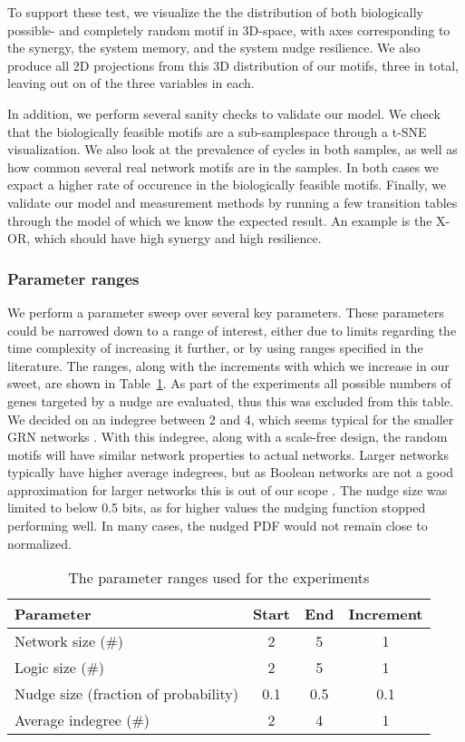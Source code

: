 \documentclass[../main.tex]{subfiles}
\begin{document}
To support these test, we visualize the the distribution of both biologically possible- and completely random motif in 3D-space, with axes corresponding to the synergy, the system memory, and the system nudge resilience.
We also produce all 2D projections from this 3D distribution of our motifs, three in total, leaving out on of the three variables in each.

In addition, we perform several sanity checks to validate our model.
We check that the biologically feasible motifs are a sub-samplespace through a t-SNE visualization.
We also look at the prevalence of cycles in both samples, as well as how common several real network motifs are in the samples.
In both cases we expact a higher rate of occurence in the biologically feasible motifs.
Finally, we validate our model and measurement methods by running a few transition tables through the model of which we know the expected result.
An example is the X-OR, which should have high synergy and high resilience.

\subsubsection{Parameter ranges}

We perform a parameter sweep over several key parameters.
These parameters could be narrowed down to a range of interest, either due to limits regarding the time complexity of increasing it further, or by using ranges specified in the literature.
The ranges, along with the increments with which we increase in our sweet, are shown in Table~\ref{parameters}.
As part of the experiments all possible numbers of genes targeted by a nudge are evaluated, thus this was excluded from this table.
We decided on an indegree between 2 and 4, which seems typical for the smaller GRN networks \cite{lahdesmaki2003learning}.
With this indegree, along with a scale-free design, the random motifs will have similar network properties to actual networks.
Larger networks typically have higher average indegrees, but as Boolean networks are not a good approximation for larger networks this is out of our scope \cite{lahdesmaki2003learning, karlebach2008modelling}.
The nudge size was limited to below 0.5 bits, as for higher values the nudging function stopped performing well.
In many cases, the nudged PDF would not remain close to normalized.

\begin{table}
\begin{center}
\label{parameters}
\caption{The parameter ranges used for the experiments}
\begin{tabular}{| l | c | c | c |}
\hline
Parameter & Start & End & Increment \\
\hline
Network size (\#) & 2 & 5 & 1 \\
Logic size (\#) & 2 & 5 & 1 \\
Nudge size (fraction of probability) & 0.1 & 0.5 & 0.1 \\
Average indegree (\#) & 2 & 4 & 1 \\
\hline
\end{tabular}
\end{center}
\end{table}
\end{document}
